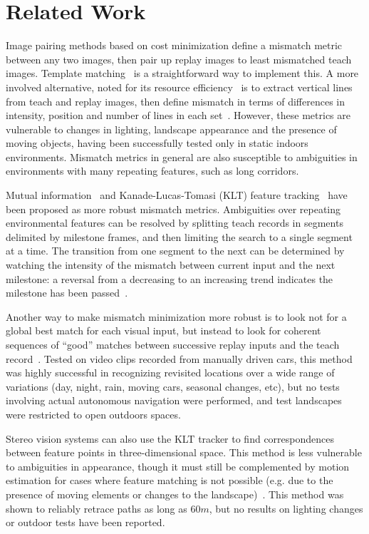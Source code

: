 \documentclass[twocolumn, 9pt,fleqn]{jsproceedings}
\begin{document}
\section{Related Work}

Image pairing methods based on cost minimization define a mismatch metric between any two images, then pair up replay images to least mismatched teach images. Template matching~\cite{MAT96} is a straightforward way to implement this. A more involved alternative, noted for its resource efficiency~\cite{BON02} is to extract vertical lines from teach and replay images, then define mismatch in terms of differences in intensity, position and number of lines in each set~\cite{OYA96}. However, these metrics are vulnerable to changes in lighting, landscape appearance and the presence of moving objects, having been successfully tested only in static indoors environments. Mismatch metrics in general are also susceptible to ambiguities in environments with many repeating features, such as long corridors.

Mutual information~\cite{STE12} and Kanade-Lucas-Tomasi (KLT) feature tracking~\cite{CHE06} have been proposed as more robust mismatch metrics. Ambiguities over repeating environmental features can be resolved by splitting teach records in segments delimited by milestone frames, and then limiting the search to a single segment at a time. The transition from one segment to the next can be determined by watching the intensity of the mismatch between current input and the next milestone: a reversal from a decreasing to an increasing trend indicates the milestone has been passed~\cite{MAT96,CHE06}.

Another way to make mismatch minimization more robust is to look not for a global best match for each visual input, but instead to look for coherent sequences of ``good'' matches between successive replay inputs and the teach record~\cite{MIL12}. Tested on video clips recorded from manually driven cars, this method was highly successful in recognizing revisited locations over a wide range of variations (day, night, rain, moving cars, seasonal changes, etc), but no tests involving actual autonomous navigation were performed, and test landscapes were restricted to open outdoors spaces.

Stereo vision systems can also use the KLT tracker to find correspondences between feature points in three-dimensional space. This method is less vulnerable to ambiguities in appearance, though it must still be complemented by motion estimation for cases where feature matching is not possible (e.g. due to the presence of moving elements or changes to the landscape)~\cite{KIM08}. This method was shown to reliably retrace paths as long as $60m$, but no results on lighting changes or outdoor tests have been reported.
\end{document}

